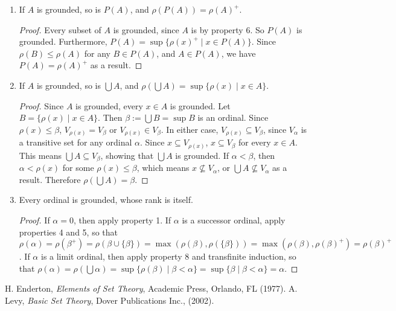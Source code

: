 \documentclass[12pt]{article}
\begin{document}
\begin{enumerate}
\begin{proof}  Every element of $B$, as an element of the grounded set $A$, is grounded, and therefore $B$ is grounded.  So $\rho(B)= \sup \lbrace \rho(x)^+ \mid x\in B\rbrace \le \sup \lbrace \rho(x)^+ \mid x\in A\rbrace = \rho(A)$.  Since $\rho(B)$ and $\rho(A)$ are both ordinals, $\rho(B)\le \rho(A)$.
\end{proof}
\item If $A$ is grounded, so is $P(A)$, and $\rho(P(A))=\rho(A)^+$.
\begin{proof}  Every subset of $A$ is grounded, since $A$ is by property 6.  So $P(A)$ is grounded.  Furthermore, $P(A) = \sup \lbrace \rho(x)^+ \mid x\in P(A)\rbrace$.  Since $\rho(B)\le \rho(A)$ for any $B\in P(A)$, and $A \in P(A)$, we have $P(A)=\rho(A)^+$ as a result.
\end{proof}
\item If $A$ is grounded, so is $\bigcup A$, and $\rho(\bigcup A)=\sup \lbrace \rho(x)\mid x\in A\rbrace$.
\begin{proof}  Since $A$ is grounded, every $x\in A$ is grounded.  Let $B=\lbrace \rho(x)\mid x\in A\rbrace$.  Then $\beta:=\bigcup B =\sup B$ is an ordinal.  Since $\rho(x)\le \beta$, $V_{\rho(x)}=V_{\beta}$ or $V_{\rho(x)}\in V_{\beta}$.  In either case, $V_{\rho(x)}\subseteq V_{\beta}$, since $V_{\alpha}$ is a transitive set for any ordinal $\alpha$.  Since $x\subseteq V_{\rho(x)}$, $x\subseteq V_{\beta}$ for every $x\in A$.  This means $\bigcup A \subseteq V_{\beta}$, showing that $\bigcup A$ is grounded.  If $\alpha < \beta$, then $\alpha < \rho(x)$ for some $\rho(x) \le \beta$, which means $x \nsubseteq V_{\alpha}$, or $\bigcup A\nsubseteq V_{\alpha}$ as a result.  Therefore $\rho(\bigcup A)=\beta$.
\end{proof}
\item Every ordinal is grounded, whose rank is itself.
\begin{proof}  If $\alpha=0$, then apply property 1.  If $\alpha$ is a successor ordinal, apply properties 4 and 5, so that $\rho(\alpha)=\rho(\beta^+) = \rho(\beta\cup \lbrace \beta\rbrace) = \max(\rho(\beta), \rho(\lbrace \beta \rbrace)) = \max(\rho(\beta), \rho(\beta)^+) = \rho(\beta)^+$.  If $\alpha$ is a limit ordinal, then apply property 8 and transfinite induction, so that $\rho(\alpha)=\rho(\bigcup \alpha)=\sup \lbrace \rho(\beta) \mid \beta < \alpha\rbrace = \sup \lbrace \beta \mid \beta< \alpha\rbrace =\alpha$.
\end{proof}
\end{enumerate}

\begin{thebibliography}{8}
 H. Enderton, {\em Elements of Set Theory}, Academic Press, Orlando, FL (1977).
 A. Levy, {\em Basic Set Theory}, Dover Publications Inc., (2002).
\end{thebibliography}
\end{document}

